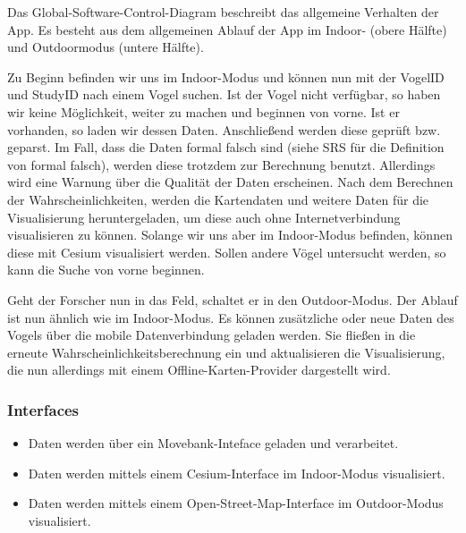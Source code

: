 \documentclass[12pt]{article} %
\begin{document}
\vspace{1em}

Das Global-Software-Control-Diagram beschreibt das allgemeine Verhalten der App. Es besteht aus dem allgemeinen Ablauf der App im Indoor- (obere Hälfte) und Outdoormodus (untere Hälfte). 

Zu Beginn befinden wir uns im Indoor-Modus und können nun mit der VogelID und StudyID nach einem Vogel suchen. Ist der Vogel nicht verfügbar, so haben wir keine Möglichkeit, weiter zu machen und beginnen von vorne. Ist er vorhanden, so laden wir dessen Daten. Anschließend werden diese geprüft bzw. geparst. Im Fall, dass die Daten formal falsch sind (siehe SRS für die Definition von formal falsch), werden diese trotzdem zur Berechnung benutzt. Allerdings wird eine Warnung über die Qualität der Daten erscheinen. Nach dem Berechnen der Wahrscheinlichkeiten, werden die Kartendaten und weitere Daten für die Visualisierung heruntergeladen, um diese auch ohne Internetverbindung visualisieren zu können. Solange wir uns aber im Indoor-Modus befinden, können diese mit Cesium visualisiert werden. Sollen andere Vögel untersucht werden, so kann die Suche von vorne beginnen.

Geht der Forscher nun in das Feld, schaltet er in den Outdoor-Modus. Der Ablauf ist nun ähnlich wie im Indoor-Modus. Es können zusätzliche oder neue Daten des Vogels über die mobile Datenverbindung geladen werden. Sie fließen in die erneute Wahrscheinlichkeitsberechnung ein und aktualisieren die Visualisierung, die nun allerdings mit einem Offline-Karten-Provider dargestellt wird. 

\subsubsection{Interfaces}
\label{sec:interfaces}
\begin{itemize}
	\item Daten werden über ein Movebank-Inteface geladen und verarbeitet. 
	\item Daten werden mittels einem Cesium-Interface im Indoor-Modus visualisiert.
	\item Daten werden mittels einem Open-Street-Map-Interface im Outdoor-Modus visualisiert.
\end{itemize}

\end{document}
